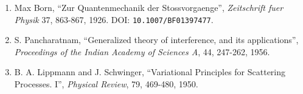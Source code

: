 \documentclass[
]{article}
\providecommand{\tightlist}{%
  \setlength{\itemsep}{0pt}\setlength{\parskip}{0pt}}
\begin{document}
\begin{enumerate}
\def\labelenumi{\arabic{enumi}.}
\setcounter{enumi}{6}
\tightlist
\item
  Max Born, ``Zur Quantenmechanik der Stossvorgaenge'',
  \emph{Zeitschrift fuer Physik} 37, 863-867, 1926. DOI:
  \texttt{10.1007/BF01397477}.
\item
  S. Pancharatnam, ``Generalized theory of interference, and its
  applications'', \emph{Proceedings of the Indian Academy of Sciences
  A}, 44, 247-262, 1956.
\item
  B. A. Lippmann and J. Schwinger, ``Variational Principles for
  Scattering Processes. I'', \emph{Physical Review}, 79, 469-480, 1950.
\end{enumerate}
\end{document}

